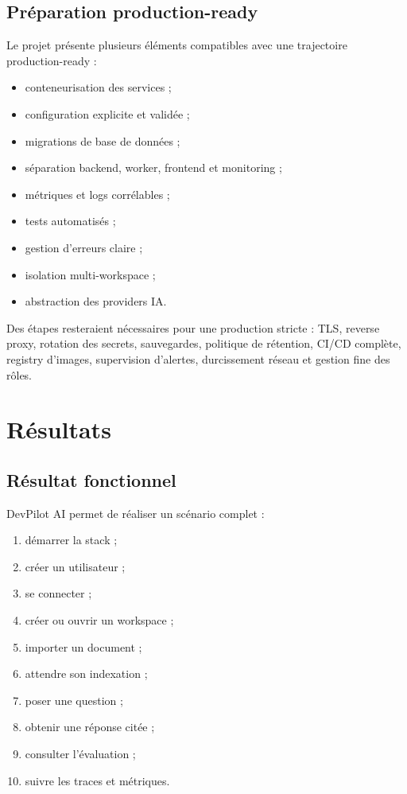 \documentclass[12pt,a4paper,oneside]{report}
\begin{document}
\section{Préparation production-ready}
Le projet présente plusieurs éléments compatibles avec une trajectoire production-ready :
\begin{itemize}
  \item conteneurisation des services ;
  \item configuration explicite et validée ;
  \item migrations de base de données ;
  \item séparation backend, worker, frontend et monitoring ;
  \item métriques et logs corrélables ;
  \item tests automatisés ;
  \item gestion d'erreurs claire ;
  \item isolation multi-workspace ;
  \item abstraction des providers IA.
\end{itemize}

Des étapes resteraient nécessaires pour une production stricte : TLS, reverse proxy, rotation des secrets, sauvegardes, politique de rétention, CI/CD complète, registry d'images, supervision d'alertes, durcissement réseau et gestion fine des rôles.

\chapter{Résultats}

\section{Résultat fonctionnel}
DevPilot AI permet de réaliser un scénario complet :
\begin{enumerate}
  \item démarrer la stack ;
  \item créer un utilisateur ;
  \item se connecter ;
  \item créer ou ouvrir un workspace ;
  \item importer un document ;
  \item attendre son indexation ;
  \item poser une question ;
  \item obtenir une réponse citée ;
  \item consulter l'évaluation ;
  \item suivre les traces et métriques.
\end{enumerate}
\end{document}
